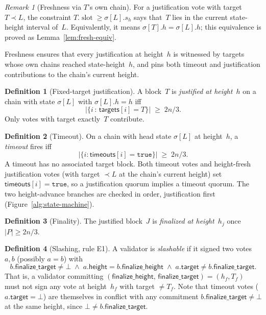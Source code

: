 \documentclass{article}
\newcommand{\slot}[0]{\ensuremath{\operatorname{\mathrm{slot}}}}
\newcommand{\target}{\mathsf{target}}
\newcommand{\height}{\mathsf{height}}
\newcommand{\finalizeHeight}{\mathsf{finalize\_height}}
\newcommand{\finalizeTarget}{\mathsf{finalize\_target}}
\newcommand{\targets}{\mathsf{targets}}
\newcommand{\timeouts}{\mathsf{timeouts}}
\theoremstyle{plain}
\theoremstyle{definition}
\newtheorem{definition}{Definition}
\theoremstyle{remark}
\newtheorem{remark}[theorem]{Remark}
\begin{document}
\begin{remark}[Freshness via $T$'s own chain]
For a justification vote with target $T \prec L$, the constraint $T.\slot \geq \sigma[L].s_h$ says that~$T$ lies in the current state-height interval of~$L$.
Equivalently, it means $\sigma[T].h = \sigma[L].h$; this equivalence is proved as Lemma~\ref{lem:fresh-equiv}.
\end{remark}

Freshness ensures that every justification at height~$h$ is witnessed by targets whose own chains reached state-height~$h$, and pins both timeout and justification contributions to the chain's current height.

\begin{definition}[Fixed-target justification]\label{def:justification}
A block~$T$ is \emph{justified at height~$h$} on a chain with state $\sigma[L]$ with $\sigma[L].h = h$ iff
\[
  \bigl|\{i \,:\, \targets[i] = T\}\bigr| \;\geq\; 2n/3.
\]
Only votes with target exactly~$T$ contribute.
\end{definition}

\begin{definition}[Timeout]\label{def:timeout}
On a chain with head state $\sigma[L]$ at height~$h$, a \emph{timeout} fires iff
\[
  \bigl|\{i : \timeouts[i] = \mathtt{true}\}\bigr| \;\geq\; 2n/3.
\]
A timeout has no associated target block.
Both timeout votes and height-fresh justification votes (with target $\prec L$ at the chain's current height) set $\timeouts[i] = \mathtt{true}$, so a justification quorum implies a timeout quorum.
The two height-advance branches are checked in order, justification first (Figure~\ref{alg:state-machine}).
\end{definition}

\begin{definition}[Finality]\label{def:finality}
The justified block~$J$ is \emph{finalized at height~$h_j$} once $|P| \geq 2n/3$.
\end{definition}

\begin{definition}[Slashing, rule E1]\label{def:slashing}
A validator is \emph{slashable} if it signed two votes~$a, b$ (possibly $a = b$) with
\[
  b.\finalizeTarget \neq \bot \;\wedge\; a.\height = b.\finalizeHeight \;\wedge\; a.\target \neq b.\finalizeTarget.
\]
That is, a validator committing $(\finalizeHeight,\, \finalizeTarget) = (h_f, T_f)$ must not sign any vote at height~$h_f$ with target $\neq T_f$.
Note that timeout votes ($a.\target = \bot$) are themselves in conflict with any commitment $b.\finalizeTarget \neq \bot$ at the same height, since $\bot \neq b.\finalizeTarget$.
\end{definition}
\end{document}
